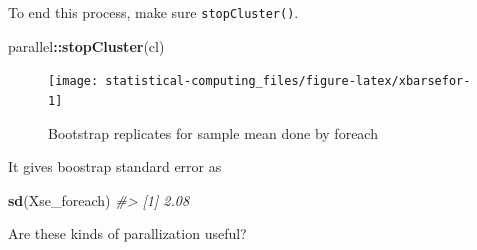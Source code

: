 \documentclass[]{book}
\newenvironment{Shaded}{\begin{snugshade}}{\end{snugshade}}
\newcommand{\CommentTok}[1]{\textcolor[rgb]{0.56,0.35,0.01}{\textit{#1}}}
\newcommand{\DataTypeTok}[1]{\textcolor[rgb]{0.13,0.29,0.53}{#1}}
\newcommand{\DecValTok}[1]{\textcolor[rgb]{0.00,0.00,0.81}{#1}}
\newcommand{\KeywordTok}[1]{\textcolor[rgb]{0.13,0.29,0.53}{\textbf{#1}}}
\newcommand{\NormalTok}[1]{#1}
\newcommand{\OperatorTok}[1]{\textcolor[rgb]{0.81,0.36,0.00}{\textbf{#1}}}
\newcommand{\StringTok}[1]{\textcolor[rgb]{0.31,0.60,0.02}{#1}}
\theoremstyle{definition}
\theoremstyle{definition}
\theoremstyle{definition}
\theoremstyle{remark}
\begin{document}
To end this process, make sure \texttt{stopCluster()}.

\begin{Shaded}
\begin{Highlighting}[]
\NormalTok{parallel}\OperatorTok{::}\KeywordTok{stopCluster}\NormalTok{(cl)}
\end{Highlighting}
\end{Shaded}

\begin{Shaded}
\end{Shaded}

\begin{figure}[H]

{\centering \texttt{[image: statistical-computing\_files/figure-latex/xbarsefor-1]} 

}

\caption{Bootstrap replicates for sample mean done by foreach}\label{fig:xbarsefor}
\end{figure}

It gives boostrap standard error as

\begin{Shaded}
\begin{Highlighting}[]
\KeywordTok{sd}\NormalTok{(Xse_foreach)}
\CommentTok{#> [1] 2.08}
\end{Highlighting}
\end{Shaded}

Are these kinds of parallization useful?
\end{document}
